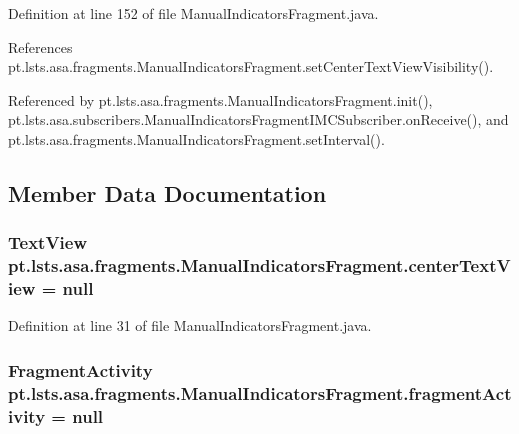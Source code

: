 Definition at line 152 of file Manual\+Indicators\+Fragment.\+java.



References pt.\+lsts.\+asa.\+fragments.\+Manual\+Indicators\+Fragment.\+set\+Center\+Text\+View\+Visibility().



Referenced by pt.\+lsts.\+asa.\+fragments.\+Manual\+Indicators\+Fragment.\+init(), pt.\+lsts.\+asa.\+subscribers.\+Manual\+Indicators\+Fragment\+I\+M\+C\+Subscriber.\+on\+Receive(), and pt.\+lsts.\+asa.\+fragments.\+Manual\+Indicators\+Fragment.\+set\+Interval().



\subsection{Member Data Documentation}
\hypertarget{classpt_1_1lsts_1_1asa_1_1fragments_1_1ManualIndicatorsFragment_aef171e095c399c66088fcf06b78cf22a}{}
\subsubsection[{center\+Text\+View}]{\setlength{\rightskip}{0pt plus 5cm}Text\+View pt.\+lsts.\+asa.\+fragments.\+Manual\+Indicators\+Fragment.\+center\+Text\+View = null\hspace{0.3cm}{\ttfamily [private]}}\label{classpt_1_1lsts_1_1asa_1_1fragments_1_1ManualIndicatorsFragment_aef171e095c399c66088fcf06b78cf22a}


Definition at line 31 of file Manual\+Indicators\+Fragment.\+java.

\hypertarget{classpt_1_1lsts_1_1asa_1_1fragments_1_1ManualIndicatorsFragment_a1cb79f4c38ab9a703b46652568dc984d}{}
\subsubsection[{fragment\+Activity}]{\setlength{\rightskip}{0pt plus 5cm}Fragment\+Activity pt.\+lsts.\+asa.\+fragments.\+Manual\+Indicators\+Fragment.\+fragment\+Activity = null\hspace{0.3cm}{\ttfamily [private]}}\label{classpt_1_1lsts_1_1asa_1_1fragments_1_1ManualIndicatorsFragment_a1cb79f4c38ab9a703b46652568dc984d}


